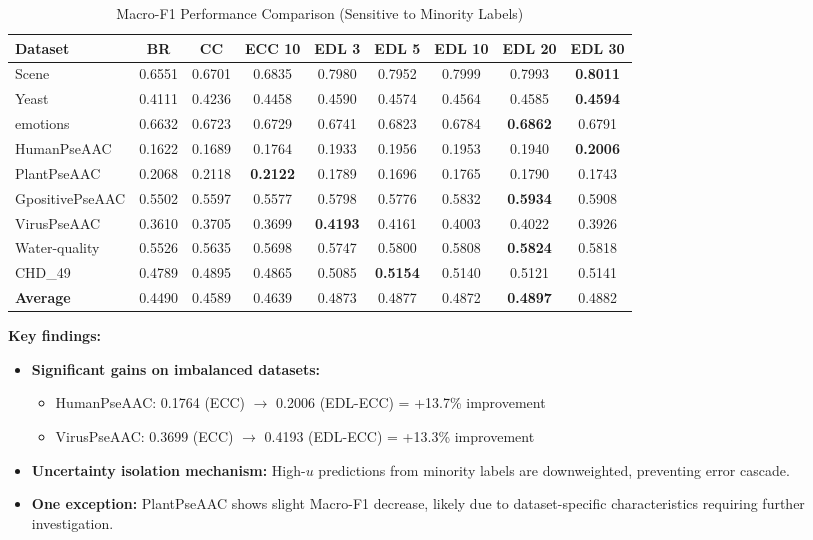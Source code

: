\documentclass[conference]{IEEEtran}
\begin{document}
\begin{table}[t]
\centering
\caption{Macro-F1 Performance Comparison (Sensitive to Minority Labels)}
\label{tab:macro_f1}
\small
\begin{tabular}{lcccccccc}
\toprule
\textbf{Dataset} & \textbf{BR} & \textbf{CC} & \textbf{ECC 10} & \textbf{EDL 3} & \textbf{EDL 5} & \textbf{EDL 10} & \textbf{EDL 20} & \textbf{EDL 30} \\
\midrule
Scene & 0.6551 & 0.6701 & 0.6835 & 0.7980 & 0.7952 & 0.7999 & 0.7993 & \textbf{0.8011} \\
Yeast & 0.4111 & 0.4236 & 0.4458 & 0.4590 & 0.4574 & 0.4564 & 0.4585 & \textbf{0.4594} \\
emotions & 0.6632 & 0.6723 & 0.6729 & 0.6741 & 0.6823 & 0.6784 & \textbf{0.6862} & 0.6791 \\
HumanPseAAC & 0.1622 & 0.1689 & 0.1764 & 0.1933 & 0.1956 & 0.1953 & 0.1940 & \textbf{0.2006} \\
PlantPseAAC & 0.2068 & 0.2118 & \textbf{0.2122} & 0.1789 & 0.1696 & 0.1765 & 0.1790 & 0.1743 \\
GpositivePseAAC & 0.5502 & 0.5597 & 0.5577 & 0.5798 & 0.5776 & 0.5832 & \textbf{0.5934} & 0.5908 \\
VirusPseAAC & 0.3610 & 0.3705 & 0.3699 & \textbf{0.4193} & 0.4161 & 0.4003 & 0.4022 & 0.3926 \\
Water-quality & 0.5526 & 0.5635 & 0.5698 & 0.5747 & 0.5800 & 0.5808 & \textbf{0.5824} & 0.5818 \\
CHD\_49 & 0.4789 & 0.4895 & 0.4865 & 0.5085 & \textbf{0.5154} & 0.5140 & 0.5121 & 0.5141 \\
\midrule
\textbf{Average} & 0.4490 & 0.4589 & 0.4639 & 0.4873 & 0.4877 & 0.4872 & \textbf{0.4897} & 0.4882 \\
\bottomrule
\end{tabular}
\end{table}

\textbf{Key findings:}
\begin{itemize}
    \item \textbf{Significant gains on imbalanced datasets:}
    \begin{itemize}
        \item HumanPseAAC: 0.1764 (ECC) $\to$ 0.2006 (EDL-ECC) = +13.7\% improvement
        \item VirusPseAAC: 0.3699 (ECC) $\to$ 0.4193 (EDL-ECC) = +13.3\% improvement
    \end{itemize}
    \item \textbf{Uncertainty isolation mechanism:} High-$u$ predictions from minority labels are downweighted, preventing error cascade.
    \item \textbf{One exception:} PlantPseAAC shows slight Macro-F1 decrease, likely due to dataset-specific characteristics requiring further investigation.
\end{itemize}
\end{document}
